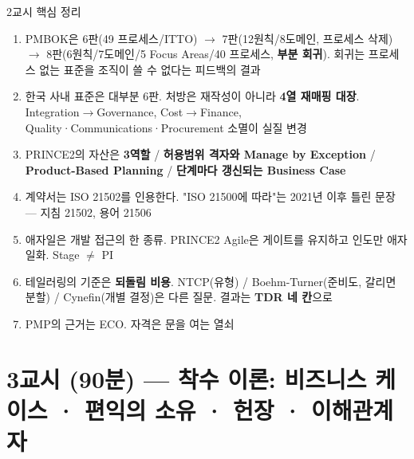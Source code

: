 \begin{frame}[allowframebreaks=1.0]{2교시 핵심 정리}
\small
\begin{enumerate}
\item\relax PMBOK은 6판(49 프로세스/ITTO) $\rightarrow$ 7판(12원칙/8도메인, 프로세스 삭제) $\rightarrow$ 8판(6원칙/7도메인/5 Focus Areas/40 프로세스, \textbf{부분 회귀}). 회귀는 프로세스 없는 표준을 조직이 쓸 수 없다는 피드백의 결과
\item\relax 한국 사내 표준은 대부분 6판. 처방은 재작성이 아니라 \textbf{4열 재매핑 대장}. Integration$\rightarrow$Governance, Cost$\rightarrow$Finance, Quality·Communications·Procurement 소멸이 실질 변경
\item\relax PRINCE2의 자산은 \textbf{3역할} / \textbf{허용범위 격자와 Manage by Exception} / \textbf{Product-Based Planning} / \textbf{단계마다 갱신되는 Business Case}
\item\relax 계약서는 ISO 21502를 인용한다. "ISO 21500에 따라"는 2021년 이후 틀린 문장 — 지침 21502, 용어 21506
\item\relax 애자일은 개발 접근의 한 종류. PRINCE2 Agile은 게이트를 유지하고 인도만 애자일화. Stage $\neq$ PI
\item\relax 테일러링의 기준은 \textbf{되돌림 비용}. NTCP(유형) / Boehm-Turner(준비도, 갈리면 분할) / Cynefin(개별 결정)은 다른 질문. 결과는 \textbf{TDR 네 칸}으로
\item\relax PMP의 근거는 ECO. 자격은 문을 여는 열쇠
\end{enumerate}
\end{frame}

\section{3교시 (90분) — 착수 이론: 비즈니스 케이스 · 편익의 소유 · 헌장 · 이해관계자}

